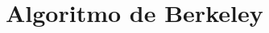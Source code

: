 \documentclass[letterpaper]{article}
\begin{document}

\tableofcontents{}

\section{Algoritmo de Berkeley}\label{sec:algor-de-berk}

\end{document}
